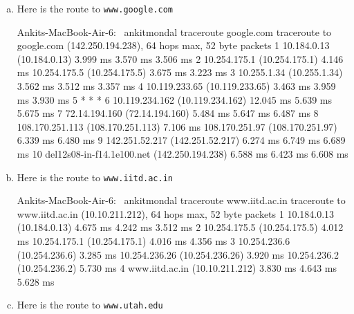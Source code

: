 \documentclass{article}
\begin{document}
\begin{enumerate}[a.]

\item Here is the route to {\tt www.google.com}
\begin{code}
Ankits-MacBook-Air-6:~ ankitmondal traceroute google.com
traceroute to google.com (142.250.194.238), 64 hops max, 52 byte packets
 1  10.184.0.13 (10.184.0.13)  3.999 ms  3.570 ms  3.506 ms
 2  10.254.175.1 (10.254.175.1)  4.146 ms
    10.254.175.5 (10.254.175.5)  3.675 ms  3.223 ms
 3  10.255.1.34 (10.255.1.34)  3.562 ms  3.512 ms  3.357 ms
 4  10.119.233.65 (10.119.233.65)  3.463 ms  3.959 ms  3.930 ms
 5  * * *
 6  10.119.234.162 (10.119.234.162)  12.045 ms  5.639 ms  5.675 ms
 7  72.14.194.160 (72.14.194.160)  5.484 ms  5.647 ms  6.487 ms
 8  108.170.251.113 (108.170.251.113)  7.106 ms
    108.170.251.97 (108.170.251.97)  6.339 ms  6.480 ms
 9  142.251.52.217 (142.251.52.217)  6.274 ms  6.749 ms  6.689 ms
10  del12s08-in-f14.1e100.net (142.250.194.238)  6.588 ms  6.423 ms  6.608 ms
\end{code}

\item Here is the route to {\tt www.iitd.ac.in}
\begin{code}
Ankits-MacBook-Air-6:~ ankitmondal traceroute www.iitd.ac.in
traceroute to www.iitd.ac.in (10.10.211.212), 64 hops max, 52 byte packets
 1  10.184.0.13 (10.184.0.13)  4.675 ms  4.242 ms  3.512 ms
 2  10.254.175.5 (10.254.175.5)  4.012 ms
    10.254.175.1 (10.254.175.1)  4.016 ms  4.356 ms
 3  10.254.236.6 (10.254.236.6)  3.285 ms
    10.254.236.26 (10.254.236.26)  3.920 ms
    10.254.236.2 (10.254.236.2)  5.730 ms
 4  www.iitd.ac.in (10.10.211.212)  3.830 ms  4.643 ms  5.628 ms
 \end{code}
 \item Here is the route to {\tt www.utah.edu}
 

\end{enumerate}
\end{document}
